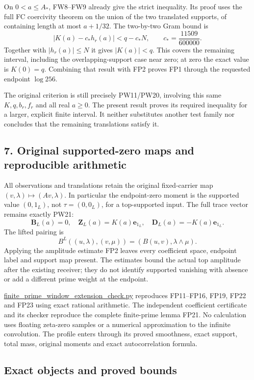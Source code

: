 \documentclass[
  10pt,
  a4paper,
]{article}
\begin{document}
On \(0<a\le A_*\), FW8--FW9 already give the strict inequality. Its
proof uses the full FC coercivity theorem on the union of the two
translated supports, of containing length at most \(a+1/32\). The
two-by-two Gram bound is \[
 |K(a)-c_*h_r(a)|<q-c_*N,\qquad
 c_*=\frac{11509}{600000}.
\] Together with \(|h_r(a)|\le N\) it gives \(|K(a)|<q\). This covers
the remaining interval, including the overlapping-support case near
zero; at zero the exact value is \(K(0)=q\). Combining that result with
FP2 proves FP1 through the requested endpoint \(\log256\).

The original criterion is still precisely PW11/PW20, involving this same
\(K,q,b_r,f_r\) and all real \(a\ge0\). The present result proves its
required inequality for a larger, explicit finite interval. It neither
substitutes another test family nor concludes that the remaining
translations satisfy it.

\subsection{7. Original supported-zero maps and reproducible
arithmetic}\label{original-supported-zero-maps-and-reproducible-arithmetic}

All observations and translations retain the original fixed-carrier map
\((v,\lambda)\mapsto(Av,\lambda)\). In particular the endpoint-zero
moment is the supported value \((0,1_L)\), not \(\tau=(0,0_L)\), for a
top-supported input. The full trace vector remains exactly PW21: \[
 \boldsymbol B_L(a)=0,\quad
 \boldsymbol Z_L(a)=K(a)\mathbf e_{1_L},\quad
 \boldsymbol D_L(a)=-K(a)\mathbf e_{1_L}.
 \tag{FP25}
\] The lifted pairing is \[
 B^L((u,\lambda),(v,\mu))=(B(u,v),\lambda\wedge\mu).
\] Applying the amplitude estimate FP2 leaves every coefficient space,
endpoint label and support map present. The estimates bound the actual
top amplitude after the existing receiver; they do not identify
supported vanishing with absence or add a different prime weight at the
endpoint.

\url{finite_prime_window_extension_check.py} reproduces FP11--FP16,
FP19, FP22 and FP23 using exact rational arithmetic. The independent
coefficient certificate and its checker reproduce the complete
finite-prime lemma FP21. No calculation uses floating zeta-zero samples
or a numerical approximation to the infinite convolution. The profile
enters through its proved smoothness, exact support, total mass,
original moments and exact autocorrelation formula.

\subsection{Exact objects and proved
bounds}\label{exact-objects-and-proved-bounds}
\end{document}
